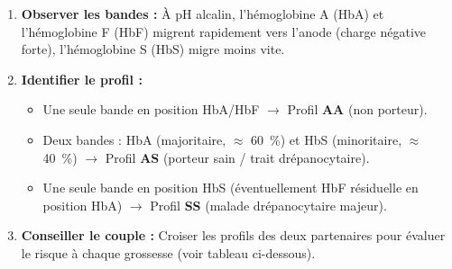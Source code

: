 \documentclass[11pt]{article}
\begin{document}
\begin{methode}
\begin{enumerate}
    \item \textbf{Observer les bandes :} À pH alcalin, l'hémoglobine A (HbA) et l'hémoglobine F (HbF) migrent rapidement vers l'anode (charge négative forte), l'hémoglobine S (HbS) migre moins vite.
    \item \textbf{Identifier le profil :}
    \begin{itemize}
        \item Une seule bande en position HbA/HbF $\rightarrow$ Profil \textbf{AA} (non porteur).
        \item Deux bandes : HbA (majoritaire, $\approx$ \SI{60}{\%}) et HbS (minoritaire, $\approx$ \SI{40}{\%}) $\rightarrow$ Profil \textbf{AS} (porteur sain / trait drépanocytaire).
        \item Une seule bande en position HbS (éventuellement HbF résiduelle en position HbA) $\rightarrow$ Profil \textbf{SS} (malade drépanocytaire majeur).
    \end{itemize}
    \item \textbf{Conseiller le couple :} Croiser les profils des deux partenaires pour évaluer le risque à chaque grossesse (voir tableau ci-dessous).
\end{enumerate}
\end{methode}
\end{document}
